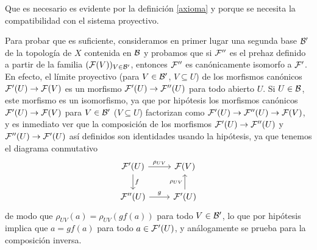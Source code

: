 \documentclass[twoside]{article}
\begin{document}
\begin{dem}
Que es necesario es evidente por la definición \ref{axioma} y porque se necesita la compatibilidad con el sistema proyectivo. %






Para probar que es suficiente, consideramos en primer lugar una segunda base ${\mathcal B}'$ de la topología de $X$ contenida en ${\mathcal B}$ y probamos que si $\mathcal{F}''$ es el prehaz definido a partir de la familia $(\mathcal{F}(V))_{V\in{\mathcal B}'}$, entonces $\mathcal{F}''$ es canónicamente isomorfo a $\mathcal{F}'$. %
En efecto, el límite proyectivo (para $V\in{\mathcal B}'$, $V\subseteq U$) de los morfismos canónicos $\mathcal{F}'(U)\to \mathcal{F}(V)$ es un morfismo $\mathcal{F}'(U)\to\mathcal{F}''(U)$ para todo abierto $U$. Si $U\in{\mathcal B}$, este morfismo es un isomorfismo, ya que por hipótesis los morfismos canónicos $\mathcal{F}'(U)\to\mathcal{F}(V)$ para $V\in{\mathcal B}'$ ($V\subseteq U$) factorizan como $\mathcal{F}'(U)\to\mathcal{F}''(U)\to\mathcal{F}(V)$, y es inmediato ver que la composición de los morfismos $\mathcal{F}'(U)\to\mathcal{F}''(U)$ y $\mathcal{F}''(U)\to\mathcal{F}'(U)$ así definidos son identidades usando la hipótesis, ya que tenemos el diagrama conmutativo
\[
\begin{tikzcd}
\calF'(U)\arrow[r, "\rho_{UV}"] \arrow[d, "f"] & \calF(V)\\
\calF''(U)\arrow[r, "g"] & \calF'(U)\arrow[u, "\rho_{UV}"]
\end{tikzcd}
\]
de modo que $\rho_{UV}(a)=\rho_{UV}(gf(a))$ para todo $V\in{\mathcal B}'$, lo que por hipótesis implica que $a=gf(a)$ para todo $a\in\mathcal{F}'(U)$, y análogamente se prueba para la composición inversa. 


\end{dem}
\end{document}
